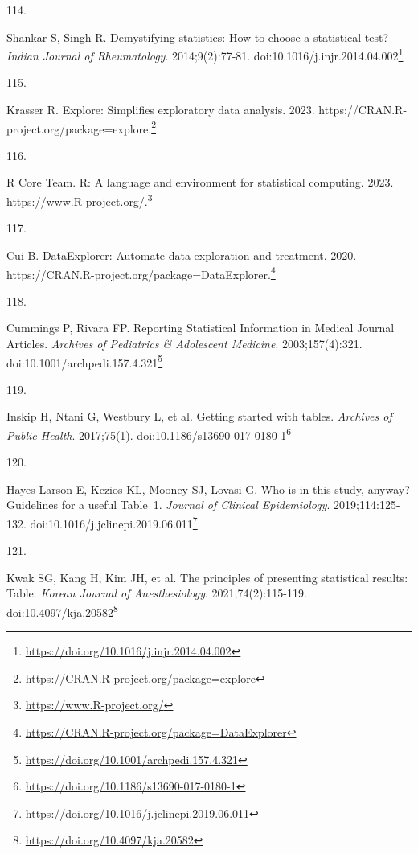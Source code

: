 \documentclass[
]{book}
\newlength{\cslhangindent}
\newlength{\csllabelwidth}
\newlength{\cslentryspacingunit} %
\newenvironment{CSLReferences}[2] %
 {%
  \setlength{\parindent}{0pt}
  \ifodd #1
  \let\oldpar\par
  \def\par{\hangindent=\cslhangindent\oldpar}
  \fi
  \setlength{\parskip}{#2\cslentryspacingunit}
 }%
 {}
\newcommand{\CSLLeftMargin}[1]{\parbox[t]{\csllabelwidth}{#1}}
\newcommand{\CSLRightInline}[1]{\parbox[t]{\linewidth - \csllabelwidth}{#1}\break}
\renewcommand{\href}[2]{#2\footnote{\url{#1}}}
\begin{document}
\begin{CSLReferences}{0}{0}
\leavevmode{}%
\CSLLeftMargin{114. }%
\CSLRightInline{Shankar S, Singh R. Demystifying statistics: How to choose a statistical test? \emph{Indian Journal of Rheumatology}. 2014;9(2):77-81. doi:\href{https://doi.org/10.1016/j.injr.2014.04.002}{10.1016/j.injr.2014.04.002}}

\leavevmode{}%
\CSLLeftMargin{115. }%
\CSLRightInline{Krasser R. Explore: Simplifies exploratory data analysis. 2023. \href{https://CRAN.R-project.org/package=explore}{https://CRAN.R-project.org/package=explore.}}

\leavevmode{}%
\CSLLeftMargin{116. }%
\CSLRightInline{R Core Team. R: A language and environment for statistical computing. 2023. \href{https://www.R-project.org/}{https://www.R-project.org/.}}

\leavevmode{}%
\CSLLeftMargin{117. }%
\CSLRightInline{Cui B. DataExplorer: Automate data exploration and treatment. 2020. \href{https://CRAN.R-project.org/package=DataExplorer}{https://CRAN.R-project.org/package=DataExplorer.}}

\leavevmode{}%
\CSLLeftMargin{118. }%
\CSLRightInline{Cummings P, Rivara FP. Reporting Statistical Information in Medical Journal Articles. \emph{Archives of Pediatrics \& Adolescent Medicine}. 2003;157(4):321. doi:\href{https://doi.org/10.1001/archpedi.157.4.321}{10.1001/archpedi.157.4.321}}

\leavevmode{}%
\CSLLeftMargin{119. }%
\CSLRightInline{Inskip H, Ntani G, Westbury L, et al. Getting started with tables. \emph{Archives of Public Health}. 2017;75(1). doi:\href{https://doi.org/10.1186/s13690-017-0180-1}{10.1186/s13690-017-0180-1}}

\leavevmode{}%
\CSLLeftMargin{120. }%
\CSLRightInline{Hayes-Larson E, Kezios KL, Mooney SJ, Lovasi G. Who is in this study, anyway? Guidelines for a useful Table~1. \emph{Journal of Clinical Epidemiology}. 2019;114:125-132. doi:\href{https://doi.org/10.1016/j.jclinepi.2019.06.011}{10.1016/j.jclinepi.2019.06.011}}

\leavevmode{}%
\CSLLeftMargin{121. }%
\CSLRightInline{Kwak SG, Kang H, Kim JH, et al. The principles of presenting statistical results: Table. \emph{Korean Journal of Anesthesiology}. 2021;74(2):115-119. doi:\href{https://doi.org/10.4097/kja.20582}{10.4097/kja.20582}}


\end{CSLReferences}
\end{document}
